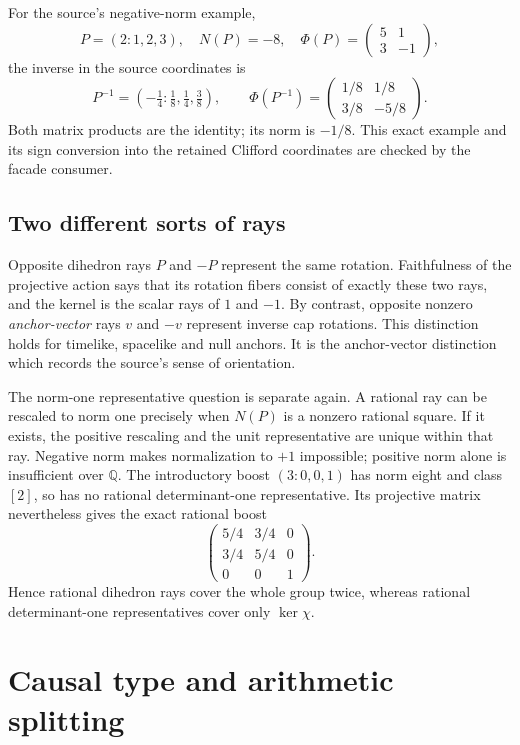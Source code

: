 \documentclass[11pt]{article}
\newcommand{\Q}{\mathbb Q}
\theoremstyle{remark}
\begin{document}
For the source's negative-norm example,
\[
 P=(2:1,2,3),\quad N(P)=-8,\quad
 \Phi(P)=\begin{pmatrix}5&1\\3&-1\end{pmatrix},
\]
the inverse in the source coordinates is
\[
 P^{-1}=(-\tfrac14:\tfrac18,\tfrac14,\tfrac38),\qquad
 \Phi(P^{-1})=\begin{pmatrix}1/8&1/8\\3/8&-5/8\end{pmatrix}.
\]
Both matrix products are the identity; its norm is \(-1/8\). This exact
example and its sign conversion into the retained Clifford coordinates are
checked by the facade consumer.

\subsection{Two different sorts of rays}

Opposite dihedron rays \(P\) and \(-P\) represent the same rotation.
Faithfulness of the projective action says that its rotation fibers consist
of exactly these two rays, and the kernel is the scalar rays of \(1\) and
\(-1\). By contrast, opposite nonzero \emph{anchor-vector} rays \(v\)
and \(-v\) represent inverse cap rotations. This distinction holds for
timelike, spacelike and null anchors. It is the anchor-vector distinction
which records the source's sense of orientation.

The norm-one representative question is separate again. A rational ray can
be rescaled to norm one precisely when \(N(P)\) is a nonzero rational square.
If it exists, the positive rescaling and the unit representative are unique
within that ray. Negative norm makes normalization to \(+1\) impossible;
positive norm alone is insufficient over \(\Q\). The introductory boost
\((3:0,0,1)\) has norm eight and class \([2]\), so has no rational
determinant-one representative. Its projective matrix nevertheless gives
the exact rational boost
\[
 \begin{pmatrix}5/4&3/4&0\\3/4&5/4&0\\0&0&1\end{pmatrix}.
\]
Hence rational dihedron rays cover the whole group twice, whereas rational
determinant-one representatives cover only \(\ker\chi\).

\section{Causal type and arithmetic splitting}
\end{document}
